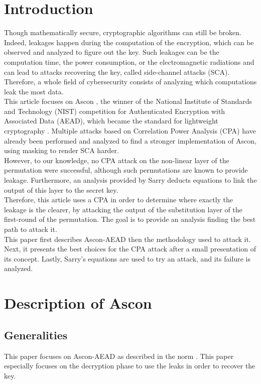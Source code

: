 \documentclass[11pt,technote]{IEEEtran}
\begin{document}
	\section{Introduction}
	Though mathematically secure, cryptographic algorithms can still be broken. Indeed, leakages happen during the computation of the encryption, which can be observed and analyzed to figure out the key. Such leakages can be the computation time, the power consumption, or the electromagnetic radiations and can lead to attacks recovering the key, called side-channel attacks (SCA). Therefore, a whole field of cybersecurity consists of analyzing which computations leak the most data.\\
	This article focuses on Ascon \cite{ascon}, the winner of the National Institute of Standards and Technology (NIST) competition for Authenticated Encryption with Associated Data (AEAD), which became the standard for lightweight cryptography \cite{norme}. Multiple attacks \cite{cpa_lin,dl_cpa} based on Correlation Power Analysis (CPA) \cite{cpa_aes} have already been performed and analyzed \cite{cpa_analysis} to find a stronger implementation of Ascon, using masking to render SCA harder.\\
	However, to our knowledge, no CPA attack on the non-linear layer of the permutation were successful, although such permutations are known to provide leakage. Furthermore, an analysis provided by Sarry\cite{these} deducts equations to link the output of this layer to the secret key.\\
	Therefore, this article uses a CPA in order to determine where exactly the leakage is the clearer, by attacking the output of the substitution layer of the first-round of the permutation. The goal is to provide an analysis finding the best path to attack it.\\
	This paper first describes Ascon-AEAD then the methodology used to attack it. Next, it presents the best choices for the CPA attack after a small presentation of its concept. Lastly, Sarry's equations \cite{these} are used to try an attack, and its failure is analyzed.
	
	\section{Description of Ascon}
	\subsection{Generalities}
	This paper focuses on Ascon-AEAD as described in the norm \cite{norme}. This paper especially focuses on the decryption phase to use the leaks in order to recover the key.
	
\end{document}
